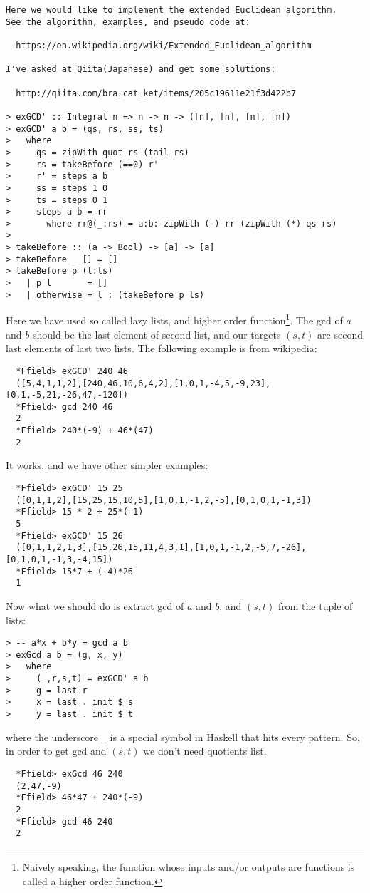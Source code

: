 \documentclass[11pt]{book}
\begin{document}
\label{extendedEuclideanAlgorithm}
\begin{verbatim}
Here we would like to implement the extended Euclidean algorithm.
See the algorithm, examples, and pseudo code at:

  https://en.wikipedia.org/wiki/Extended_Euclidean_algorithm

I've asked at Qiita(Japanese) and get some solutions:

  http://qiita.com/bra_cat_ket/items/205c19611e21f3d422b7

> exGCD' :: Integral n => n -> n -> ([n], [n], [n], [n])
> exGCD' a b = (qs, rs, ss, ts)
>   where
>     qs = zipWith quot rs (tail rs)
>     rs = takeBefore (==0) r'
>     r' = steps a b
>     ss = steps 1 0
>     ts = steps 0 1
>     steps a b = rr
>       where rr@(_:rs) = a:b: zipWith (-) rr (zipWith (*) qs rs)
>         
> takeBefore :: (a -> Bool) -> [a] -> [a]
> takeBefore _ [] = []
> takeBefore p (l:ls)
>   | p l       = []
>   | otherwise = l : (takeBefore p ls)
\end{verbatim}
Here we have used so called lazy lists, and higher order function\footnote{
Naively speaking, the function whose inputs and/or outputs are functions is called a higher order function.
}.
The gcd of $a$ and $b$ should be the last element of second list, and our targets $(s,t)$ are second last elements of last two lists.
The following example is from wikipedia:
\begin{verbatim}
  *Ffield> exGCD' 240 46
  ([5,4,1,1,2],[240,46,10,6,4,2],[1,0,1,-4,5,-9,23],[0,1,-5,21,-26,47,-120])
  *Ffield> gcd 240 46
  2
  *Ffield> 240*(-9) + 46*(47)
  2
\end{verbatim}
It works, and we have other simpler examples:
\begin{verbatim}
  *Ffield> exGCD' 15 25
  ([0,1,1,2],[15,25,15,10,5],[1,0,1,-1,2,-5],[0,1,0,1,-1,3])
  *Ffield> 15 * 2 + 25*(-1)
  5
  *Ffield> exGCD' 15 26
  ([0,1,1,2,1,3],[15,26,15,11,4,3,1],[1,0,1,-1,2,-5,7,-26],[0,1,0,1,-1,3,-4,15])
  *Ffield> 15*7 + (-4)*26
  1
\end{verbatim}
Now what we should do is extract gcd of $a$ and $b$, and $(s,t)$ from the tuple of lists:
\begin{verbatim}
> -- a*x + b*y = gcd a b
> exGcd a b = (g, x, y)
>   where
>     (_,r,s,t) = exGCD' a b
>     g = last r
>     x = last . init $ s
>     y = last . init $ t
\end{verbatim}
where the underscore \verb+_+ is a special symbol in Haskell that hits every pattern.
So, in order to get gcd and $(s,t)$ we don't need quotients list.
\begin{verbatim}
  *Ffield> exGcd 46 240
  (2,47,-9)
  *Ffield> 46*47 + 240*(-9)
  2
  *Ffield> gcd 46 240
  2
\end{verbatim}
\end{document}
